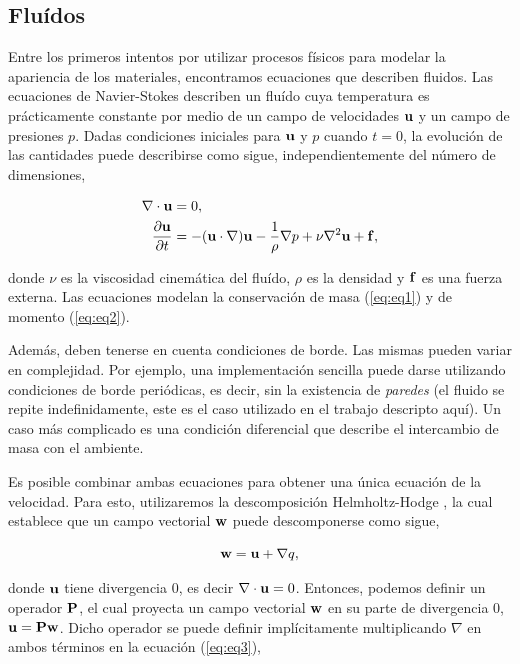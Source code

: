 \subsection{Fluídos}
Entre los primeros intentos por utilizar procesos físicos para modelar la apariencia de los materiales, encontramos ecuaciones que describen fluidos.
Las ecuaciones de Navier-Stokes describen un fluído cuya temperatura es prácticamente constante por medio de un campo de velocidades $\bold{u}$ y un campo de presiones $p$.
Dadas condiciones iniciales para $\bold{u}$ y $p$ cuando $t = 0$, la evolución de las cantidades puede describirse como sigue, independientemente del número de dimensiones,

\begin{align}
\nabla \cdot \bold{u} &= 0, \label{eq:eq1}\\
\frac{\partial \bold{u} }{\partial t} &= - (\bold{u} \cdot \nabla) \bold{u} - \frac{1}{\rho} \nabla p + \nu \nabla^{2} \bold{u} + \bold{f} \label{eq:eq2},
\end{align}

donde $\nu$ es la viscosidad cinemática del fluído, $\rho$ es la densidad y $\bold{f}$ es una fuerza externa.
Las ecuaciones modelan la conservación de masa (\ref{eq:eq1}) y de momento (\ref{eq:eq2}).

Además, deben tenerse en cuenta condiciones de borde.
Las mismas pueden variar en complejidad.
Por ejemplo, una implementación sencilla puede darse utilizando condiciones de borde periódicas, es decir, sin la existencia de {\em paredes} (el fluido se repite indefinidamente, este es el caso utilizado en el trabajo descripto aquí).
Un caso más complicado es una condición diferencial que describe el intercambio de masa con el ambiente.

Es posible combinar ambas ecuaciones para obtener una única ecuación de la velocidad.
Para esto, utilizaremos la descomposición Helmholtz-Hodge \cite{Chorin1990}, la cual establece que un campo vectorial $\bold{w}$ puede descomponerse como sigue, 

\begin{equation}
\label{eq:eq3}
\bold{w} = \bold{u} + \nabla q,
\end{equation}

donde $\bold{u}$ tiene divergencia $0$, es decir $\nabla\cdot\bold{u} = 0$.
Entonces, podemos definir un operador $\bold{P}$, el cual proyecta un campo vectorial $\bold{w}$ en su parte de divergencia $0$, $\bold{u} = \bold{P}\bold{w}$.
Dicho operador se puede definir implícitamente multiplicando $\nabla$ en ambos términos en la ecuación (\ref{eq:eq3}),


